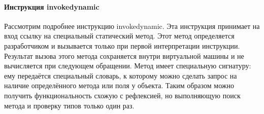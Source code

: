 \paragraph{Инструкция invokedynamic}
Рассмотрим подробнее инструкцию invokedynamic. Эта инструкция принимает на вход ссылку на специальный статический метод. Этот метод определяется разработчиком и вызывается только при первой интерпретации инструкции. Результат вызова этого метода сохраняется внутри виртуальной машины и не вычисляется при следующем обращении. Метод имеет специальную сигнатуру: ему передаётся специальный словарь, к которому можно сделать запрос на наличие определённого метода или поля у объекта. Таким образом можно получить функциональность схожую с рефлексией, но выполняющую поиск метода и проверку типов только один раз.